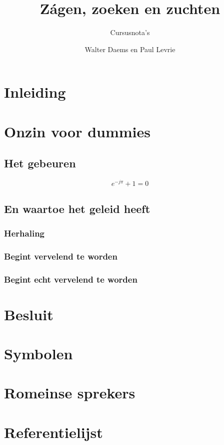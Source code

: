 \documentclass[a4paper,11pt,oneside,openright,english,qr,copyright]{uantwerpencoursetext}
\title{Z\'agen, zoeken en zuchten}
\subtitle{Cursusnota's}
\author{Walter Daems en Paul Levrie}
\begin{document}

\maketitle

\frontmatter

\tableofcontents

\mainmatter
\chapter*{Inleiding}
\lipsum[1]
\chapter{Onzin voor dummies}

\section{Het gebeuren}
\lipsum[2]
\begin{equation}
  e^{-j\pi} + 1 = 0
\end{equation}

\lipsum[3]
\section{En waartoe het geleid heeft}

\lipsum[4]

\subsection{Herhaling}

\lipsum[5]

\subsection{Begint vervelend te worden}

\lipsum[6]
\newpage

\subsection{Begint echt vervelend te worden}

\lipsum[7-10]

\chapter{Besluit}

\appendix

\chapter{Symbolen}
\chapter{Romeinse sprekers}
\chapter{Referentielijst}

\makefinalpage
\end{document}
